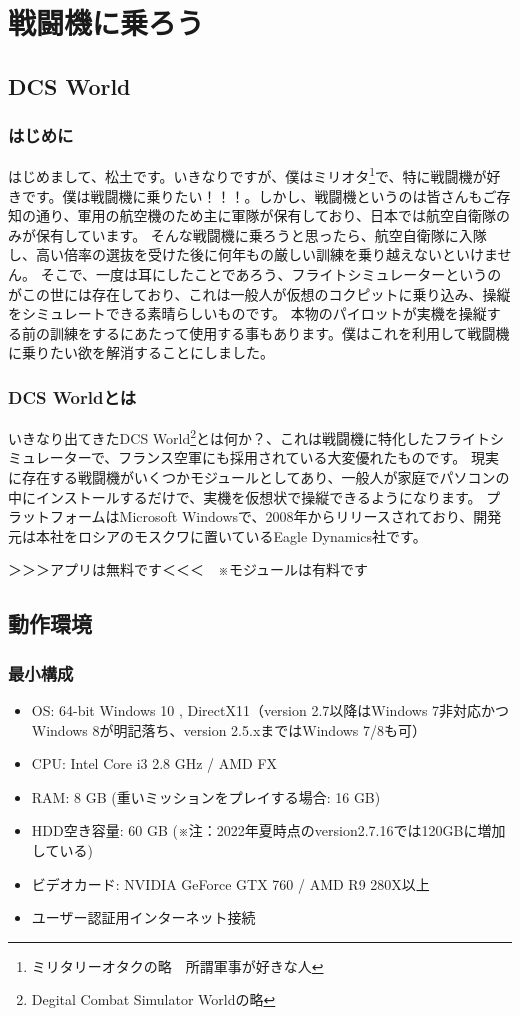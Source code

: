 \section{戦闘機に乗ろう}
\subsection{DCS World}
\subsubsection{はじめに}
はじめまして、松土です。いきなりですが、僕はミリオタ\footnote{ミリタリーオタクの略　所謂軍事が好きな人}で、特に戦闘機が好きです。僕は戦闘機に乗りたい！！！。しかし、戦闘機というのは皆さんもご存知の通り、軍用の航空機のため主に軍隊が保有しており、日本では航空自衛隊のみが保有しています。
そんな戦闘機に乗ろうと思ったら、航空自衛隊に入隊し、高い倍率の選抜を受けた後に何年もの厳しい訓練を乗り越えないといけません。
そこで、一度は耳にしたことであろう、フライトシミュレーターというのがこの世には存在しており、これは一般人が仮想のコクピットに乗り込み、操縦をシミュレートできる素晴らしいものです。
本物のパイロットが実機を操縦する前の訓練をするにあたって使用する事もあります。僕はこれを利用して戦闘機に乗りたい欲を解消することにしました。
\subsubsection{DCS Worldとは}
いきなり出てきたDCS World\footnote{Degital Combat Simulator Worldの略}とは何か？、これは戦闘機に特化したフライトシミュレーターで、フランス空軍にも採用されている大変優れたものです。
現実に存在する戦闘機がいくつかモジュールとしてあり、一般人が家庭でパソコンの中にインストールするだけで、実機を仮想状で操縦できるようになります。
プラットフォームはMicrosoft Windowsで、2008年からリリースされており、開発元は本社をロシアのモスクワに置いているEagle Dynamics社です。


＞＞＞アプリは無料です＜＜＜　※モジュールは有料です
\subsection{動作環境}
\subsubsection{最小構成}
\begin{itemize}
  \item OS: 64-bit Windows 10 , DirectX11（version 2.7以降はWindows 7非対応かつWindows 8が明記落ち、version 2.5.xまではWindows 7/8も可）
  \item CPU: Intel Core i3 2.8 GHz / AMD FX
  \item RAM: 8 GB (重いミッションをプレイする場合: 16 GB)
  \item HDD空き容量: 60 GB (※注：2022年夏時点のversion2.7.16では120GBに増加している)
  \item ビデオカード: NVIDIA GeForce GTX 760 / AMD R9 280X以上
  \item ユーザー認証用インターネット接続
\end{itemize}

